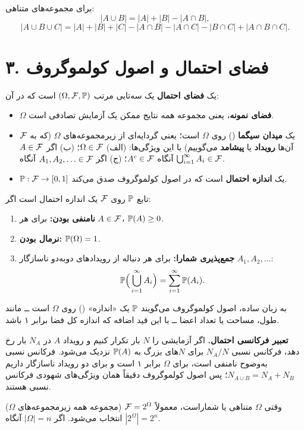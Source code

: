 \begin{theorem}
برای مجموعه‌های متناهی:
\[|A\cup B|=|A|+|B|-|A\cap B|,\]
\[|A\cup B\cup C|=|A|+|B|+|C|-|A\cap B|-|A\cap C|-|B\cap C|+|A\cap B\cap C|.\]
\end{theorem}

\section*{۳. فضای احتمال و اصول کولموگروف}

\begin{definition}
یک \textbf{فضای احتمال} یک سه‌تایی مرتب $(\Omega,\mathcal{F},\mathbb{P})$ است که در آن:
\begin{itemize}
\item $\Omega$ \textbf{فضای نمونه}، یعنی مجموعه همه نتایج ممکن یک آزمایش تصادفی است.
\item $\mathcal{F}$ یک \textbf{میدان سیگما} () روی $\Omega$ است؛ یعنی گردایه‌ای از زیرمجموعه‌های $\Omega$ (که به آن‌ها \textbf{رویداد} یا \textbf{پیشامد} می‌گوییم) با این ویژگی‌ها:
 (الف) $\Omega\in\mathcal{F}$؛ (ب) اگر $A\in\mathcal{F}$ آنگاه $A^c\in\mathcal{F}$؛ (ج) اگر $A_1,A_2,\ldots\in\mathcal{F}$ آنگاه $\bigcup_{i=1}^\infty A_i\in\mathcal{F}$.
\item $\mathbb{P}:\mathcal{F}\to[0,1]$ یک \textbf{اندازه احتمال} است که در اصول کولموگروف صدق می‌کند.
\end{itemize}
\end{definition}

\begin{definition}
تابع $\mathbb{P}$ روی $\mathcal{F}$ یک اندازه احتمال است اگر:
\begin{enumerate}
\item \textbf{نامنفی بودن:} برای هر $A\in\mathcal{F}$، $\mathbb{P}(A)\ge 0$.
\item \textbf{نرمال بودن:} $\mathbb{P}(\Omega)=1$.
\item \textbf{جمع‌پذیری شمارا:} برای هر دنباله از رویدادهای دوبه‌دو ناسازگار $A_1,A_2,\ldots$:
\[\mathbb{P}\Big(\bigcup_{i=1}^{\infty}A_i\Big)=\sum_{i=1}^{\infty}\mathbb{P}(A_i).\]
\end{enumerate}
\end{definition}

به زبان ساده، اصول کولموگروف می‌گویند $\mathbb{P}$ یک «اندازه» () روی $\Omega$ است ــ مانند طول، مساحت یا تعداد اعضا ــ با این قید اضافه که اندازه کل فضا برابر ۱ باشد.

\begin{note}
\notetitle \textbf{تعبیر فرکانسی احتمال.} اگر آزمایشی را $N$ بار تکرار کنیم و رویداد $A$ در $N_A$ بار رخ دهد، فرکانس نسبی $N_A/N$ برای $N$های بزرگ به $\mathbb{P}(A)$ نزدیک می‌شود. فرکانس نسبی به‌وضوح نامنفی است، برای $\Omega$ برابر ۱ است و برای دو رویداد ناسازگار داریم $N_{A\cup B}=N_A+N_B$؛ پس اصول کولموگروف دقیقاً همان ویژگی‌های شهودی فرکانس نسبی هستند.
\end{note}

\begin{note}
\notetitle وقتی $\Omega$ متناهی یا شماراست، معمولاً $\mathcal{F}=2^\Omega$ (مجموعه همه زیرمجموعه‌های $\Omega$) انتخاب می‌شود. اگر $|\Omega|=n$ آنگاه $|2^\Omega|=2^n$.
\end{note}
